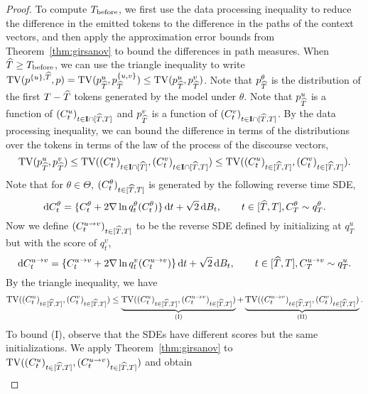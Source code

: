 \begin{proof}
\noindent To compute $T_{\mathrm{before}}$, we first use the data processing inequality to reduce the difference in the emitted tokens to the difference in the paths of the context vectors, and then apply the approximation error bounds from Theorem~\ref{thm:girsanov} to bound the differences in path measures. When $\widehat{T} \geq T_{\mathrm{before}}$, we can use the triangle inequality to write
$\TV(\modrevlaw{\{u\}}{\wh{T}}{},p) = \TV(p^u_{\wh{T}},p^{\{u,v\}}_{\wh{T}}) \leq \TV(p^u_{\wh{T}},p^v_{\wh{T}})$. Note that $p^\theta_{\widehat{T}}$ is the distribution of the first $T-\widehat{T}$ tokens generated by the model under $\theta$. Note that $p^u_{\widehat{T}}$ is a function of $(C^u_t)_{t \in \mathbf{I}\cap[\widehat{T},T]}$ and $p^v_{\widehat{T}}$ is a function of $(C^v_t)_{t \in \mathbf{I}\cap[\widehat{T},T]}$. By the data processing inequality, we can bound the difference in terms of the distributions over the tokens in terms of the law of the process of the discourse vectors, $$\mathrm{TV}(p^u_{\widehat{T}},p^v_{\widehat{T}}) \leq \mathrm{TV}((C^u_t)_{t \in \mathbf{I}\cap[\widehat{T}]},(C^v_t)_{t \in \mathbf{I}\cap[\widehat{T},T]}) \leq \mathrm{TV}((C^u_t)_{t \in [\widehat{T},T]},(C^v_t)_{t \in [\widehat{T},T]}).$$ 
Note that for $\theta \in \Theta$, $(C^\theta_t)_{t \in [\widehat{T},T]}$ is generated by the following reverse time SDE, 
\begin{equation}
    \mathrm{d} C^\theta_t = \{C^\theta_t + 2\nabla\ln q^\theta_{t}(C^\theta_t)\}\,\mathrm{d} t + \sqrt{2}\,\mathrm{d} B_t,  \qquad t \in [\widehat{T},T], C^\theta_T \sim q^\theta_T. \label{eq:reverse_discourse}
\end{equation}
Now we define $(C^{u \to v}_t)_{t \in [\widehat{T},T]}$ to be the reverse SDE defined by initializing at $q^u_T$ but with the score of $q^v_t$,
\begin{equation}
    \mathrm{d} C^{u \to v}_t = \{C^{u \to v}_t + 2\nabla\ln q^v_{t}(C^{u \to v}_t)\}\,\mathrm{d} t + \sqrt{2}\,\mathrm{d} B_t,  \qquad t \in [\widehat{T},T], C^{u \to v}_T \sim q^u_T. \label{eq:reverse_discourse_mod}
\end{equation}
By the triangle inequality, we have 
\begin{align*}
\mathrm{TV}((C^u_t)_{t \in [\widehat{T},T]},(C^v_t)_{t \in [\widehat{T},T]}) \leq \underbrace{\mathrm{TV}((C^u_t)_{t \in [\widehat{T},T]},(C^{u \to v}_t)_{t \in [\widehat{T},T]})}_{\text{(I)}}+\underbrace{\mathrm{TV}((C^{u \to v}_t)_{t \in [\widehat{T},T]},(C^{v}_t)_{t \in [\widehat{T},T]})}_{\text{(II)}}. 
\end{align*}
\noindent To bound (I), observe that the SDEs have different scores but the same initializations. We apply Theorem~\ref{thm:girsanov} to $\mathrm{TV}((C^u_t)_{t \in [\widehat{T},T]},(C^{u \to v}_t)_{t \in [\widehat{T},T]})$ and obtain 
\begin{align*}

\end{align*}
\end{proof}
